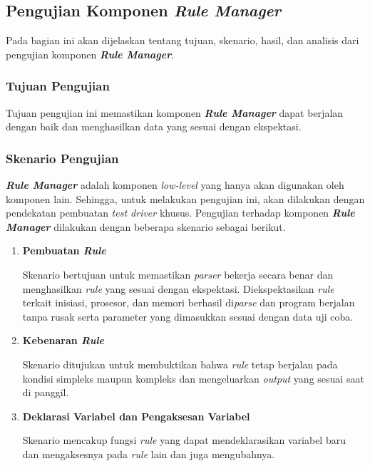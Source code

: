 \subsection{Pengujian Komponen \textit{Rule Manager}}

Pada bagian ini akan dijelaskan tentang tujuan, skenario, hasil, dan analisis dari pengujian komponen \textbf{\textit{Rule Manager}}.

\subsubsection{Tujuan Pengujian}

Tujuan pengujian ini memastikan komponen \textbf{\textit{Rule Manager}} dapat berjalan dengan baik dan menghasilkan data yang sesuai dengan ekspektasi.

\subsubsection{Skenario Pengujian}

\textbf{\textit{Rule Manager}} adalah komponen \textit{low-level} yang hanya akan digunakan oleh komponen lain. Sehingga, untuk melakukan pengujian ini, akan dilakukan dengan pendekatan pembuatan \textit{test driver} khusus. Pengujian terhadap komponen \textbf{\textit{Rule Manager}} dilakukan dengan beberapa skenario sebagai berikut.
\begin{enumerate}
    \item \bfseries Pembuatan \textit{Rule}\normalfont
    
        Skenario bertujuan untuk memastikan \textit{parser} bekerja secara benar dan menghasilkan \textit{rule} yang sesuai dengan ekspektasi. Diekspektasikan \textit{rule} terkait inisiasi, prosesor, dan memori berhasil di\textit{parse} dan program berjalan tanpa rusak serta parameter yang dimasukkan sesuai dengan data uji coba. 

    \item \bfseries Kebenaran \textit{Rule}\normalfont
    
        Skenario ditujukan untuk membuktikan bahwa \textit{rule} tetap berjalan pada kondisi simpleks maupun kompleks dan mengeluarkan \textit{output} yang sesuai saat di panggil.

    \item \bfseries Deklarasi Variabel dan Pengaksesan Variabel\normalfont
    
        Skenario mencakup fungsi \textit{rule} yang dapat mendeklarasikan variabel baru dan mengaksesnya pada \textit{rule} lain dan juga mengubahnya.
\end{enumerate}

